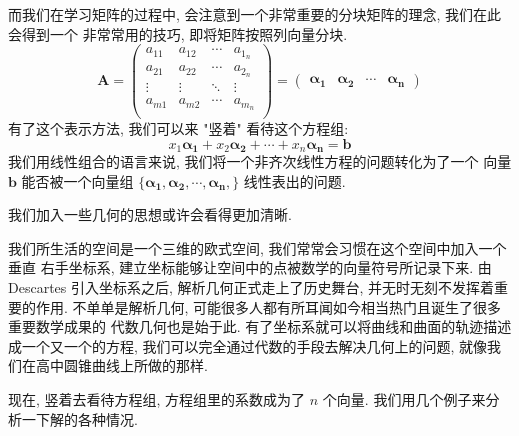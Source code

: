 \documentclass[UTF8]{book}
\begin{document}
而我们在学习矩阵的过程中, 会注意到一个非常重要的分块矩阵的理念, 我们在此会得到一个
非常常用的技巧, 即将矩阵按照列向量分块. 
\begin{equation} \label{eq.linear formula vector}
    \mathbf{A} = 
    \begin{pmatrix}
        a_{11} & a_{12} & \cdots & a_{1_n} \\
        a_{21} & a_{22} & \cdots & a_{2_n} \\
        \vdots & \vdots & \ddots & \vdots \\
        a_{m1} & a_{m2} & \cdots & a_{m_n} \\
    \end{pmatrix}
    =
    \begin{pmatrix}
        \boldsymbol{\alpha_1} & \boldsymbol{\alpha_2} & 
        \cdots & \boldsymbol{\alpha_n} 
    \end{pmatrix}
\end{equation}
有了这个表示方法, 我们可以来 "竖着" 看待这个方程组: 
\begin{equation} \label{eq.linear formula vector sum}
    x_1 \boldsymbol{\alpha_1} + x_2 \boldsymbol{\alpha_2} + \cdots + 
    x_n \boldsymbol{\alpha_n} = \boldsymbol{b}
\end{equation}
我们用线性组合的语言来说, 我们将一个非齐次线性方程的问题转化为了一个
向量 $\boldsymbol{b} $ 能否被一个向量组 $\{\boldsymbol{\alpha_1},
\boldsymbol{\alpha_2},\cdots, \boldsymbol{\alpha_n}, \}$ 
线性表出的问题.

我们加入一些几何的思想或许会看得更加清晰. 

我们所生活的空间是一个三维的欧式空间, 我们常常会习惯在这个空间中加入一个垂直
右手坐标系, 建立坐标能够让空间中的点被数学的向量符号所记录下来. 由 Descartes 
引入坐标系之后, 解析几何正式走上了历史舞台, 并无时无刻不发挥着重要的作用. 
不单单是解析几何, 可能很多人都有所耳闻如今相当热门且诞生了很多重要数学成果的
代数几何也是始于此. 有了坐标系就可以将曲线和曲面的轨迹描述成一个又一个的方程, 
我们可以完全通过代数的手段去解决几何上的问题, 就像我们在高中圆锥曲线上所做的那样. 

现在, 竖着去看待方程组, 方程组里的系数成为了 $n$ 个向量. 
我们用几个例子来分析一下解的各种情况. 
\end{document}
